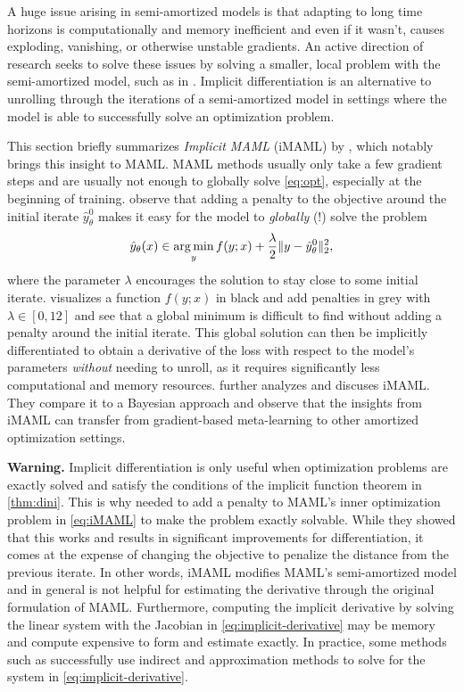 A huge issue arising in semi-amortized models is that adapting
to long time horizons is computationally and memory inefficient
and even if it wasn't, causes exploding, vanishing, or
otherwise unstable gradients.
An active direction of research seeks to solve these issues by
solving a smaller, local problem with the semi-amortized model,
such as in \citet{chen2019modular,rajeswaran2019meta}.
Implicit differentiation is an alternative to unrolling through
the iterations of a semi-amortized model in settings where the
model is able to successfully solve an optimization problem.

This section briefly summarizes \emph{Implicit MAML} (iMAML) by \citet{rajeswaran2019meta},
which notably brings this insight to MAML.
MAML methods usually only take a few gradient steps and
are usually not enough to globally solve \cref{eq:opt},
especially at the beginning of training.
\citet{rajeswaran2019meta} observe that adding a penalty
to the objective around the initial iterate
$\hat y^0_\theta$ makes it easy for the model to
\emph{globally} (!) solve the problem
\begin{equation}
  \label{eq:iMAML}
  \hat y_\theta(x) \in \operatorname*{arg\,min}_y f(y; x) + \frac{\lambda}{2}\|y-\hat y^0_\theta\|_2^2,
\end{equation}
where the parameter $\lambda$ encourages the
solution to stay close to some initial iterate.
 visualizes a function $f(y; x)$
in black and add penalties in grey with
$\lambda\in[0,12]$ and see that a global
minimum is difficult to find without adding a penalty
around the initial iterate.
This global solution can then be implicitly differentiated to obtain
a derivative of the loss with respect to the model's parameters
\emph{without} needing to unroll, as it requires
significantly less computational and memory resources.
\citet{huszar2019imaml} further analyzes and discuses iMAML.
They compare it to a Bayesian approach and observe that the insights
from iMAML can transfer from gradient-based meta-learning to
other amortized optimization settings.

\textbf{Warning.} Implicit differentiation is only useful
when optimization problems are exactly solved and satisfy
the conditions of the implicit function theorem in \cref{thm:dini}.
This is why \citet{rajeswaran2019meta} needed to add a penalty
to MAML's inner optimization problem in \cref{eq:iMAML} to
make the problem exactly solvable.
While they showed that this works and results in significant
improvements for differentiation, it comes at the expense of
changing the objective to penalize the distance from the
previous iterate.
In other words, iMAML modifies MAML's semi-amortized model
and in general is not helpful for estimating the derivative
through the original formulation of MAML.
Furthermore, computing the implicit derivative by
solving the linear system with the Jacobian
in \cref{eq:implicit-derivative} may be memory and
compute expensive to form and estimate exactly.
In practice, some methods such as \citet{bai2019deep}
successfully use indirect and approximation methods
to solve for the system in \cref{eq:implicit-derivative}.

